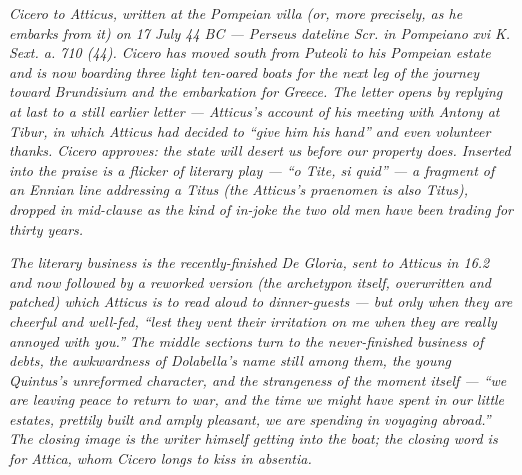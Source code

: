 
\textit{Cicero to Atticus, written at the Pompeian villa
(or, more precisely, as he embarks from it) on 17 July 44 BC
--- Perseus dateline \textit{Scr. in Pompeiano xvi K. Sext.
a. 710 (44)}. Cicero has moved south from Puteoli to his
Pompeian estate and is now boarding three light ten-oared
boats for the next leg of the journey toward Brundisium and
the embarkation for Greece. The letter opens by replying at
last to a still earlier letter --- Atticus's account of his
meeting with Antony at Tibur, in which Atticus had decided to
``give him his hand'' and even volunteer thanks. Cicero
approves: the state will desert us before our property does.
Inserted into the praise is a flicker of literary play ---
``\textit{o Tite, si quid}'' --- a fragment of an Ennian line
addressing a Titus (the Atticus's praenomen is also Titus),
dropped in mid-clause as the kind of in-joke the two old men
have been trading for thirty years.}

\textit{The literary business is the recently-finished
\textit{De Gloria}, sent to Atticus in 16.2 and now followed
by a reworked version (the \textit{archetypon} itself,
overwritten and patched) which Atticus is to read aloud to
dinner-guests --- but only when they are cheerful and
well-fed, ``lest they vent their irritation on me when they
are really annoyed with you.'' The middle sections turn to
the never-finished business of debts, the awkwardness of
Dolabella's name still among them, the young Quintus's
unreformed character, and the strangeness of the moment
itself --- ``we are leaving peace to return to war, and the
time we might have spent in our little estates, prettily
built and amply pleasant, we are spending in voyaging
abroad.'' The closing image is the writer himself getting
into the boat; the closing word is for Attica, whom Cicero
longs to kiss in absentia.}
